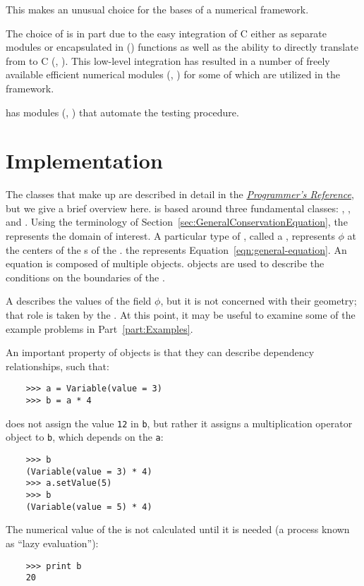 This makes \Python{} an unusual
choice for the bases of a numerical framework.

The choice of \Python{} is in part due to the easy integration of C
either as separate modules or encapsulated in \Python{} (\weave{})
functions as well as the ability to directly translate from \Python{}
to C (\blitz{}, \PyRex{}).  This low-level integration has resulted in
a number of freely available efficient numerical modules (\SciPy{},
\Numeric{}) for \Python{} some of which are utilized in the \FiPy{}
framework.

\Python{} has modules (\doctest{}, \unittest{}) that automate the
testing procedure.

\section{Implementation}

The \Python{} classes that make up \FiPy{} are described in detail in
the \href{file:reference.pdf}{\textit{\FiPy{} Programmer's Reference}},
but we give a brief overview here.  \FiPy{} is based around three
fundamental \Python{} classes: , , and
.  Using the terminology of
Section~\ref{sec:GeneralConservationEquation}, the  represents
the domain of interest. A particular type of
, called a , represents \( \phi
\) at the centers of the s of the . the  represents
Equation~\eqref{eqn:general-equation}.  An equation is composed of multiple
 objects.   objects are used to
describe the conditions on the boundaries of the .

A  describes the values of the field \( \phi \),
but it is not concerned with their geometry; that role is taken by the
.  At this point, it may be useful to examine some of the
example problems in Part~\ref{part:Examples}.

An important property of  objects is that they can
describe dependency relationships, such that:
\begin{verbatim}
    >>> a = Variable(value = 3)
    >>> b = a * 4
\end{verbatim}
does not assign the value \verb|12| in \verb|b|, but rather it assigns
a multiplication operator object to \verb|b|, which depends on the
 \verb|a|:
\begin{verbatim}
    >>> b
    (Variable(value = 3) * 4)
    >>> a.setValue(5)
    >>> b
    (Variable(value = 5) * 4)
\end{verbatim}
The numerical value of the  is not calculated until it
is needed (a process known as ``lazy evaluation''):
\begin{verbatim}
    >>> print b
    20
\end{verbatim}



